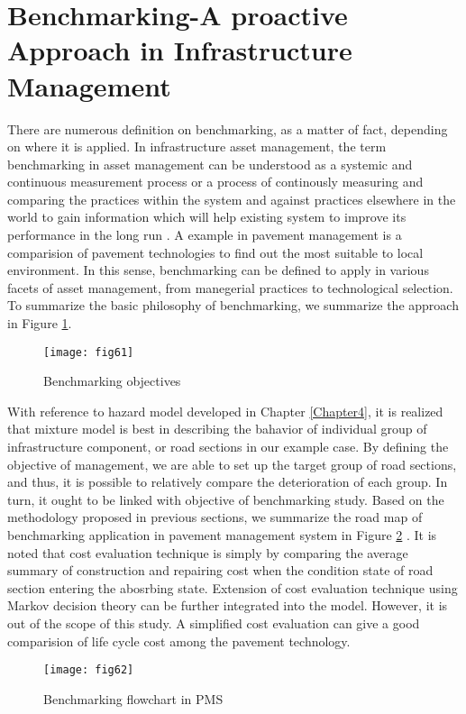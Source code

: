 \section{Benchmarking-A proactive Approach in Infrastructure Management}
\label{62}
There are numerous definition on benchmarking, as a matter of fact, depending on where it is applied. In infrastructure asset management, the term benchmarking in asset management can be understood as a systemic and continuous measurement process or a process of continously measuring and comparing the practices within the system and against practices elsewhere in the world to gain information which will help existing system to improve its performance in the long run \cite{karlof}. A example in pavement management is a comparision of pavement technologies to find out the most suitable to local environment. In this sense, benchmarking can be defined to apply in various facets of asset management, from manegerial practices to technological selection. To summarize the basic philosophy of benchmarking, we summarize the approach in Figure \ref{fig61}.

\begin{figure}[t]
\begin{center}
\texttt{[image: fig61]} 
\end{center}
\caption{Benchmarking objectives}
\label{fig61} 
\end{figure}
With reference to hazard model developed in Chapter \ref{Chapter4}, it is realized that mixture model is best in describing the bahavior of individual group of infrastructure component, or road sections in our example case. By defining the objective of management, we are able to set up the target group of road sections, and thus, it is possible to relatively compare the deterioration of each group. In turn, it ought to be linked with objective of benchmarking study. Based on the methodology proposed in previous sections, we summarize the road map of benchmarking application in pavement management system in Figure \ref{fig62} . It is noted that cost evaluation technique is simply by comparing the average summary of construction and repairing cost when the condition state of road section entering the abosrbing state. Extension of cost evaluation technique using Markov decision theory can be further integrated into the model. However, it is out of the scope of this study. A simplified cost evaluation can give a good comparision of life cycle cost among the pavement technology. 

\begin{figure}[t]
\begin{center}
\texttt{[image: fig62]}
\end{center}
\caption{Benchmarking flowchart in PMS}
\label{fig62} 
\end{figure}
%
